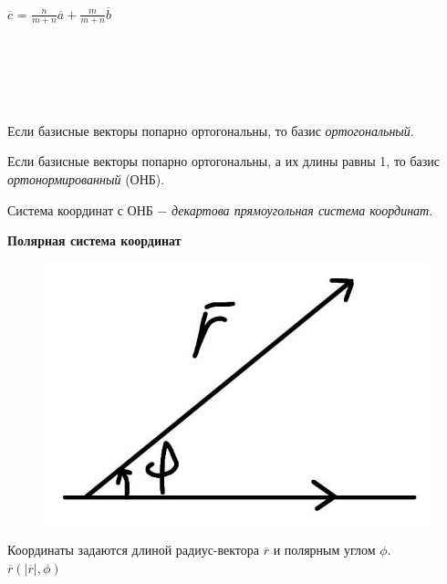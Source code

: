\tab\\

$\overline{c}$ = $\frac{n}{m + n}\overline{a} + \frac{m}{m + n}\overline{b}$

\tab\\ \tab\\ \tab\\ \tab\\

\begin{definition}
	Если базисные векторы попарно ортогональны, то базис \textit{ортогональный}.
\end{definition}

\begin{definition}
	Если базисные векторы попарно ортогональны, а их длины равны 1, то базис \textit{ортонормированный} (ОНБ).
\end{definition}

\begin{definition}
	Система координат с ОНБ $-$ \textit{декартова прямоугольная система координат}.
\end{definition}

\textbf{Полярная система координат}\\
\begin{figure}
	\includegraphics[width=0.6\linewidth]{images/полярнаяск.jpeg}
\end{figure}

Координаты задаются длиной радиус-вектора $\overline{r}$ и полярным углом $\phi$.\\

$\overline{r}(|\overline{r}|, \phi)$

\tab\\ \tab\\ \tab\\

